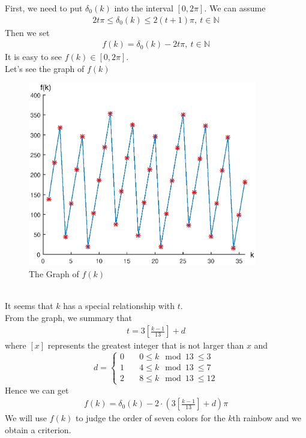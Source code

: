 \documentclass{article}
\begin{document}
\begin{spacing}{1.5}
First, we need to put $\delta_0(k)$ into the interval $[0,2\pi]$. We can assume \begin{align*}2t\pi \leq \delta_0(k)\leq 2(t+1)\pi, \ t\in\mathbb{N}\end{align*}
Then we set \begin{align*}
f(k)=\delta_0(k)-2t\pi, \ t\in\mathbb{N}
\end{align*}
It is easy to see $f(k)\in[0,2\pi]$.\\
Let's see the graph of $f(k)$ \\
\begin{figure}[!htb]
\centering
\includegraphics[width=10cm]{Figure2.eps}
\caption{The Graph of $f(k)$}
\end{figure}
\\
It seems that $k$ has a special relationship with $t$.\\
From the graph, we summary that \begin{align*}
t=3[\frac{k-1}{13}]+d
\end{align*}
where $[x]$ represents the greatest integer that is not larger than $x$ and
\begin{equation*}
d=
\begin{cases}
0\quad & 0\leq k\mod 13\ \leq 3\\
1 \quad& 4\leq k\mod 13\ \leq 7\\
2 \quad & 8\leq k\mod 13\ \leq 12
\end{cases}
\end{equation*}
Hence we can get \begin{align*}
f(k)= \delta_0(k)-2\cdot(3[\frac{k-1}{13}]+d)\pi
\end{align*}
We will use $f(k)$ to judge the order of seven colors for the $k$th rainbow and we obtain a criterion.\\\\

\end{spacing}
\end{document}
